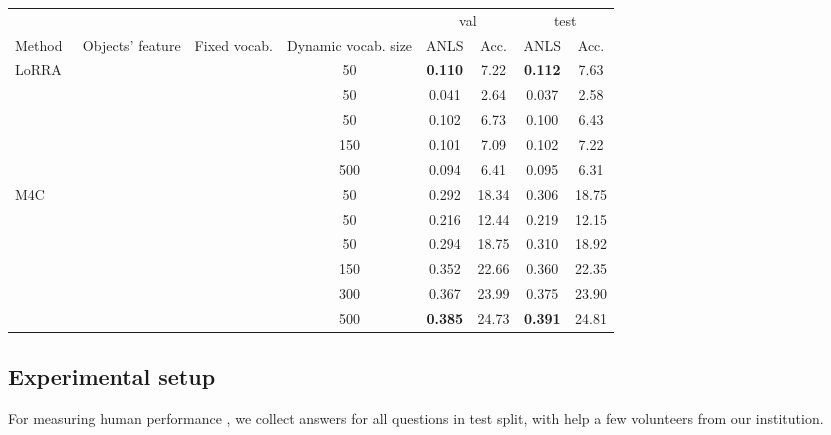 \documentclass[10pt,twocolumn,letterpaper]{article}
\newcommand{\datasetName}{DocVQA\xspace}
\newcommand{\lorra}{LoRRA\xspace}
\newcommand{\mc}{M4C\xspace}
\newcommand{\cmark}{\ding{51}}\newcommand{\xmark}{\ding{55}}
\begin{document}
\begin{table*}[h]
\small
\begin{tabularx}{\linewidth}{X | c c c | c c c c}
\toprule
 &   &    &  & \multicolumn{2}{c}{val} & \multicolumn{2}{c}{test} \\             
Method  & Objects' feature & Fixed vocab.  & Dynamic vocab. size   & ANLS & Acc.  & ANLS & Acc.  \\
\midrule
\multirow{4}{*}{\lorra~\cite{textvqa}}
 & \cmark & \cmark & 50 & \textbf{0.110} & 7.22 & \textbf{0.112} & 7.63\\ 

 & \cmark & \xmark & 50 & 0.041 & 2.64 & 0.037 & 2.58\\ & \xmark & \cmark & 50 & 0.102 & 6.73 & 0.100 & 6.43\\ & \cmark & \cmark & 150 & 0.101 & 7.09 & 0.102 & 7.22\\  & \cmark & \cmark & 500 & 0.094 & 6.41 & 0.095 & 6.31\\  

\midrule

\multirow{4}{*}{\mc~\cite{m4c}}
 & \cmark & \cmark & 50 & 0.292 & 18.34 & 0.306 & 18.75\\ & \cmark & \xmark & 50 & 0.216 & 12.44 & 0.219 & 12.15\\ & \xmark & \cmark & 50 & 0.294 & 18.75 & 0.310 & 18.92\\ & \xmark & \cmark & 150 & 0.352 & 22.66 & 0.360 & 22.35\\ & \xmark & \cmark & 300 & 0.367 & 23.99 & 0.375 & 23.90\\ & \xmark & \cmark & 500 & \textbf{0.385} & 24.73 & \textbf{0.391} & 24.81\\ 

\bottomrule
\end{tabularx}
\caption{Performance of the VQA models which are capable of reading text --- \lorra~\cite{textvqa} and \mc\cite{m4c}. Detection of visual objects and their features (bottom-up attention), which is a common practice in VQA is ineffective in case of \datasetName.
}
\label{tab:vqa_results}
\vspace{-2mm}

\end{table*}


\subsection{Experimental setup}
\label{sec: experimental setup}
For measuring  human performance , we collect answers for all questions in test split, with help a few volunteers from our institution. 
\end{document}
